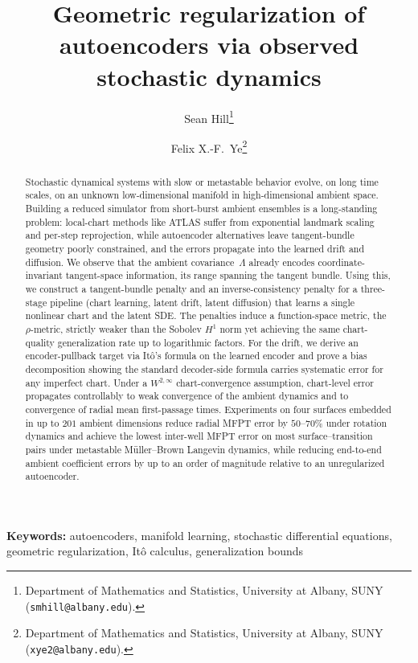 \documentclass[11pt]{article}
\title{Geometric regularization of autoencoders via observed stochastic dynamics}
\author{
Sean Hill\thanks{Department of Mathematics and Statistics, University at Albany, SUNY (\texttt{smhill@albany.edu}).}
\and
Felix X.-F.\ Ye\thanks{Department of Mathematics and Statistics, University at Albany, SUNY (\texttt{xye2@albany.edu}).}
}
\date{}
\begin{document}
\sloppy
\maketitle

\begin{abstract}
Stochastic dynamical systems with slow or metastable
behavior evolve, on long time scales, on an unknown
low-dimensional manifold in high-dimensional ambient
space.
Building a reduced simulator from short-burst ambient
ensembles is a long-standing problem: local-chart
methods like ATLAS suffer from exponential landmark
scaling and per-step reprojection, while autoencoder
alternatives leave tangent-bundle geometry poorly
constrained, and the errors propagate into the
learned drift and diffusion.
We observe that the ambient covariance~$\Lambda$
already encodes coordinate-invariant tangent-space
information, its range spanning the tangent bundle.
Using this, we construct a tangent-bundle penalty and
an inverse-consistency penalty for a three-stage
pipeline (chart learning, latent drift, latent
diffusion) that learns a single nonlinear chart and
the latent SDE.
The penalties induce a function-space metric, the
$\rho$-metric, strictly weaker than the Sobolev $H^1$
norm yet achieving the same chart-quality
generalization rate up to logarithmic factors.
For the drift, we derive an encoder-pullback target
via It\^o's formula on the learned encoder and prove
a bias decomposition showing the standard
decoder-side formula carries systematic error for any
imperfect chart.
Under a $W^{2,\infty}$ chart-convergence assumption,
chart-level error propagates controllably to weak
convergence of the ambient dynamics and to
convergence of radial mean first-passage times.
Experiments on four surfaces embedded in up to $201$
ambient dimensions reduce radial MFPT error by
$50$--$70\%$ under rotation dynamics and achieve the
lowest inter-well MFPT error on most
surface--transition pairs under metastable
M\"uller--Brown Langevin dynamics, while reducing
end-to-end ambient coefficient errors by up to an
order of magnitude relative to an unregularized
autoencoder.
\end{abstract}

\medskip
\noindent\textbf{Keywords:}
autoencoders, manifold learning, stochastic differential equations, geometric regularization, It\^o calculus, generalization bounds
\end{document}
